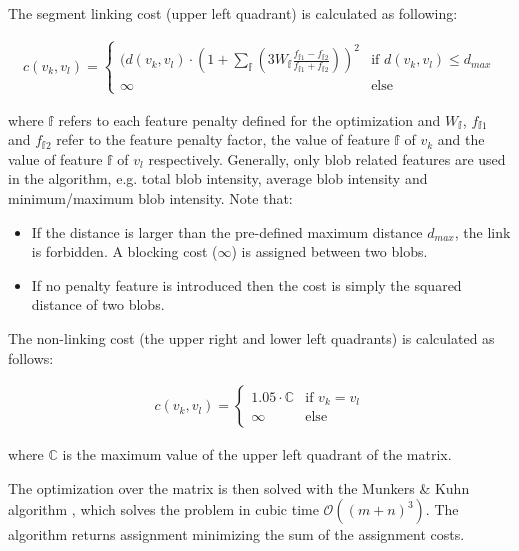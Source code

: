 \documentclass[pdftex,12pt,a4paper]{report}
\begin{document}
The segment linking cost (upper left quadrant) is calculated as following:

\begin{gather*}
c(v_k, v_l) =
\begin{cases}
  (d(v_k, v_l) \cdot \left(1 + \sum_{\mathbb{f}} \left(3 W_{\mathbb{f}} \frac{ f_{\mathbb{f}1} - f_{\mathbb{f}2} }{f_{\mathbb{f}1} + f_{\mathbb{f}2}} \right)\right)^2 & \text{if } d(v_k, v_l) \leq d_{max} \\    
  \infty & \text{else}  
\end{cases}
\end{gather*}

where $\mathbb{f}$ refers to each feature penalty defined for the optimization and $W_{\mathbb{f}}$, $f_{\mathbb{f}1}$ and $f_{\mathbb{f}2}$ refer to the feature penalty factor, the value of feature $\mathbb{f}$ of $v_k$ and the value of  feature $\mathbb{f}$ of $v_l$ respectively. Generally, only blob related features are used in the algorithm, e.g. total blob intensity, average blob intensity and minimum/maximum blob intensity. Note that:

\begin{itemize}
\item If the distance is larger than the pre-defined maximum distance $d_{max}$, the link is forbidden. A blocking cost ($\infty$) is assigned between two blobs.
\item If no penalty feature is introduced then the cost is simply the squared distance of two blobs.
\end{itemize}

The non-linking cost (the upper right and lower left quadrants) is calculated as follows:

\begin{gather*}
c(v_k, v_l) =
\begin{cases}
  1.05 \cdot \mathbb{C} & \text{if } v_k = v_l \\
  \infty & \text{else}  
\end{cases}
\end{gather*}

where $\mathbb{C}$ is the maximum value of the upper left quadrant of the matrix.

The optimization over the matrix is then solved with the Munkers \& Kuhn algorithm \cite{munkres1957algorithms}, which solves the problem in cubic time $\mathcal{O}((m + n)^3)$. The algorithm returns assignment minimizing the sum of the assignment costs.
\end{document}
